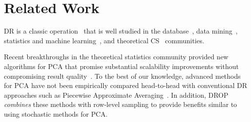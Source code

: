 \section{Related Work}
\label{sec:relwork}
\label{sec:relatedwork}

 DR is a
classic operation~\cite{dr-survey1,dr-survey2,trefethen,nonlinear-dr} that is
well studied in the
database~\cite{keogh-indexing,local-dr,charu-ss,dynamic-ss}, data
mining~\cite{sax,paa}, statistics and machine
learning~\cite{alecton,shamir}, and theoretical CS~\cite{bernstein,pca-stoc} communities.

Recent breakthroughs in the theoretical statistics community provided new algorithms for PCA that promise substantial scalability improvements without compromising result quality~\cite{alecton,tropp,re-new, tropp}. 
To the best of our knowledge, advanced methods for PCA
have not been empirically compared head-to-head with conventional
DR approaches such as Piecewise Approximate
Averaging~\cite{paa}.%
In addition, DROP
\emph{combines} these methods with row-level sampling to provide benefits similar to using stochastic methods for PCA.



